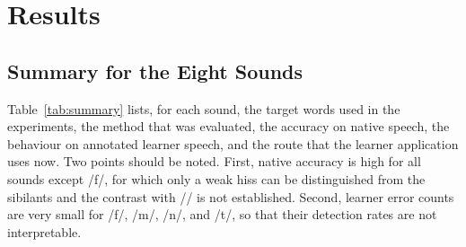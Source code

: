 \documentclass[conference]{IEEEtran}
\newcommand{\ipa}[1]{/#1/}
\begin{document}
\section{Results}
\subsection{Summary for the Eight Sounds}
Table~\ref{tab:summary} lists, for each sound, the target words used in the experiments, the method that was evaluated, the accuracy on native speech, the behaviour on annotated learner speech, and the route that the learner application uses now. Two points should be noted. First, native accuracy is high for all sounds except \ipa{f}, for which only a weak hiss can be distinguished from the sibilants and the contrast with \ipa{\texttheta} is not established. Second, learner error counts are very small for \ipa{f}, \ipa{m}, \ipa{n}, and \ipa{t\textesh}, so that their detection rates are not interpretable.
\end{document}
